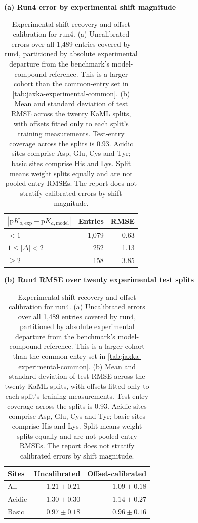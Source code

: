 \begin{table}[p]
    \centering\small
    \textbf{(a) Run4 error by experimental shift magnitude}\par\medskip
    \begin{tabular}{@{}lrr@{}}
    \toprule
    $|\mathrm{p}K_{a,\mathrm{exp}}-\mathrm{p}K_{a,\mathrm{model}}|$ & Entries & RMSE \\
    \midrule
    $<1$ & 1,079 & 0.63 \\
    $1\leq |\Delta|<2$ & 252 & 1.13 \\
    $\geq2$ & 158 & 3.85 \\
    \bottomrule
    \end{tabular}
    \par\bigskip
    \textbf{(b) Run4 RMSE over twenty experimental test splits}\par\medskip
    \begin{tabular}{@{}lrr@{}}
    \toprule
    Sites & Uncalibrated & Offset-calibrated \\
    \midrule
    All & $1.21\pm0.21$ & $1.09\pm0.18$ \\
    Acidic & $1.30\pm0.30$ & $1.14\pm0.27$ \\
    Basic & $0.97\pm0.18$ & $0.96\pm0.16$ \\
    \bottomrule
    \end{tabular}
    \caption{Experimental shift recovery and offset calibration for run4. (a) Uncalibrated errors over all 1,489 entries covered by run4, partitioned by absolute experimental departure from the benchmark's model-compound reference. This is a larger cohort than the common-entry set in \cref{tab:jaxka-experimental-common}. (b) Mean and standard deviation of test RMSE across the twenty KaML splits, with offsets fitted only to each split's training measurements. Test-entry coverage across the splits is 0.93. Acidic sites comprise Asp, Glu, Cys and Tyr; basic sites comprise His and Lys. Split means weight splits equally and are not pooled-entry RMSEs. The report does not stratify calibrated errors by shift magnitude.}
    \label{tab:jaxka-experimental-diagnostics}
\end{table}
